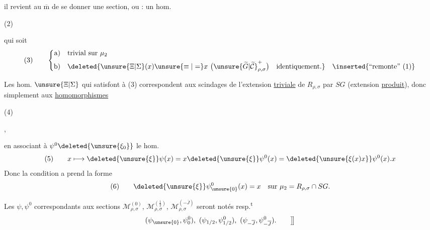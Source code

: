 
il revient au $\overline{\mathrm m}$ de se donner une section,
ou : un hom.

\begin{samepage}
\noindent (2)\quad
{}
\end{samepage}

qui soit 
\[
\text{(3)}\qquad
\left\{\begin{aligned}
\text{a)}\quad &\text{trivial sur }\mu_2\\
\text{b)}\quad &\deleted{\unsure{\Xi|\Sigma}(x)\unsure{\equiv|=}x\ \bigl(\unsure{\widetilde G|\widetilde{\mathcal C}}^+_{\rho,\sigma}\bigr)\quad\text{identiquement}.}\quad\inserted{\text{``remonte'' (1)}}
\end{aligned}\right.
\]

Les hom. $\unsure{\Xi|\Sigma}$ qui satisfont à (3) correspondent
aux scindages de l'extension \uline{triviale} de
$R_{\rho,\sigma}$ par $SG$ (extension \uline{produit}), donc
simplement aux \uline{homomorphismes}

\begin{samepage}
\noindent (4)\quad
{}
\end{samepage},



en associant à $\psi^0\deleted{\unsure{\xi_0}}$ le hom.
\[
(5)\qquad x\longmapsto \deleted{\unsure{\xi}}\psi(x)
=x\deleted{\unsure{\xi}}\psi^0(x)
=\deleted{\unsure{\xi(x)x}}\psi^0(x).x
\]
Donc la condition a prend la forme
\[
(6)\qquad \deleted{\unsure{\xi}}\psi^0_{\unsure{0}}(x)=x
\quad\text{sur }\mu_2=R_{\rho,\sigma}\cap SG.
\]

\margin{\deleted{\unsure{$\rho$}}}
Les $\psi,\psi^0$ correspondants aux  sections
$\mathcal M_{\rho,\sigma}^{(0)}$, $\mathcal M_{\rho,\sigma}^{(\frac12)}$,
$\mathcal M_{\rho,\sigma}^{(-\overline J)}$ seront notés resp.\textsuperscript{t}
\[
(\psi_{\unsure{0}},\psi^0_0),\ (\psi_{1/2},\psi^0_{1/2}),\
(\psi_{-\overline J},\psi^0_{-\overline J}).\qquad\big]\!\big]
\]

